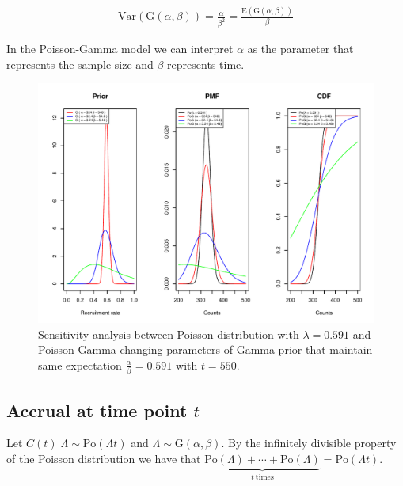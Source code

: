 \begin{align*}
\textrm{Var}(\textrm{G}(\alpha, \beta)) = \frac{\alpha}{\beta^2} =\frac{\textrm{E}(\textrm{G}(\alpha, \beta))}{\beta}
\end{align*}

In the Poisson-Gamma model we can interpret $\alpha$ as the parameter that represents the sample size and $\beta$ represents time.

\begin{figure}
\begin{knitrout}
\color{fgcolor}

{\centering \includegraphics[width=\textwidth-3cm]{figure/ch02_figunnamed-chunk-10-1} 

}


\end{knitrout}
	\caption{Sensitivity analysis between Poisson distribution with $\lambda = 0.591$ and Poisson-Gamma changing parameters of Gamma prior that maintain same expectation $\frac{\alpha}{\beta} = 0.591$ with $t=550$.}
  \label{fig:2_6b}
\end{figure}

\subsection{Accrual at time point $t$}
Let $C(t)|\Lambda \sim \textrm{Po}(\Lambda t)$ and $\Lambda \sim \textrm{G}(\alpha,\beta)$. By the infinitely divisible property of the Poisson distribution we have that $\underbrace{\textrm{Po} (\Lambda) +\cdots +\textrm{Po} (\Lambda)}_{t \ \text{times}} = \textrm{Po} (\Lambda t)$. 

